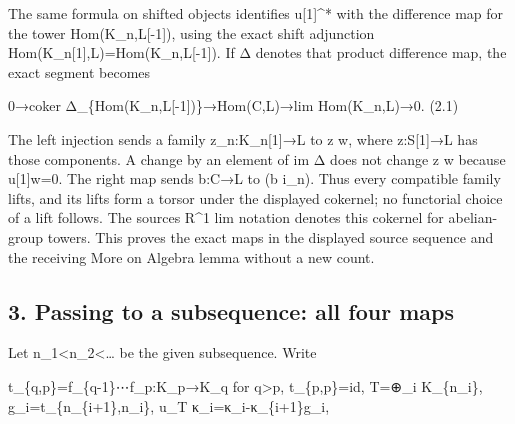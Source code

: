 \documentclass[11pt]{article}
\begin{document}
The same formula on shifted objects identifies u[1]\allowbreak{}\textasciicircum{}* with the difference map for the tower Hom(K\_\allowbreak{}n,\allowbreak{}L[-1]\allowbreak{})\allowbreak{},\allowbreak{} using the exact shift adjunction Hom(K\_\allowbreak{}n[1]\allowbreak{},\allowbreak{}L)\allowbreak{}\allowbreak{}=Hom(K\_\allowbreak{}n,\allowbreak{}L[-1]\allowbreak{})\allowbreak{}. If Δ denotes that product difference map,\allowbreak{} the exact segment becomes

0\allowbreak{}→coker Δ\_\allowbreak{}\{Hom(K\_\allowbreak{}n,\allowbreak{}L[-1]\allowbreak{})\allowbreak{}\}\allowbreak{}→Hom(C,\allowbreak{}L)\allowbreak{}\allowbreak{}→lim Hom(K\_\allowbreak{}n,\allowbreak{}L)\allowbreak{}\allowbreak{}→0. (2.1)\allowbreak{}

The left injection sends a family z\_\allowbreak{}n:\allowbreak{}K\_\allowbreak{}n[1]\allowbreak{}\allowbreak{}→L to z w,\allowbreak{} where z:\allowbreak{}S[1]\allowbreak{}\allowbreak{}→L has those components. A change by an element of im Δ does not change z w because u[1]\allowbreak{}w\allowbreak{}=0. The right map sends b:\allowbreak{}C\allowbreak{}→L to (b i\_\allowbreak{}n)\allowbreak{}. Thus every compatible family lifts,\allowbreak{} and its lifts form a torsor under the displayed cokernel; no functorial choice of a lift follows. The source\textquotesingle s R\^{}1 lim notation denotes this cokernel for abelian-group towers. This proves the exact maps in the displayed source sequence and the receiving More on Algebra lemma without a new count.

\subsection{\texorpdfstring{3. Passing to a subsequence:\allowbreak{} all four maps}{3. Passing to a  all four maps}}\label{proofs-10139-10427-passing-to-a-subsequence-all-four-maps}

Let n\_\allowbreak{}1<n\_\allowbreak{}2<… be the given subsequence. Write

t\_\allowbreak{}\{q,\allowbreak{}p\}\allowbreak{}=f\_\allowbreak{}\{q-1\}⋯f\_\allowbreak{}p:\allowbreak{}K\_\allowbreak{}p\allowbreak{}→K\_\allowbreak{}q for q>p,\allowbreak{} t\_\allowbreak{}\{p,\allowbreak{}p\}\allowbreak{}=id,\allowbreak{} T\allowbreak{}=\allowbreak{}⊕\_\allowbreak{}i K\_\allowbreak{}\{n\_\allowbreak{}i\},\allowbreak{} g\_\allowbreak{}i\allowbreak{}=t\_\allowbreak{}\{n\_\allowbreak{}\{i\allowbreak{}+1\},\allowbreak{}n\_\allowbreak{}i\},\allowbreak{} u\_\allowbreak{}T κ\_\allowbreak{}i\allowbreak{}=κ\_\allowbreak{}i-κ\_\allowbreak{}\{i\allowbreak{}+1\}g\_\allowbreak{}i,\allowbreak{}
\end{document}
